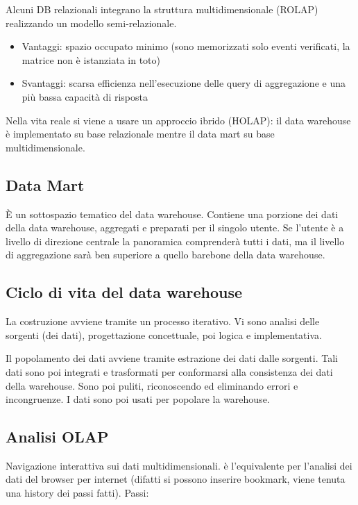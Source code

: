 Alcuni DB relazionali integrano la struttura multidimensionale (ROLAP)
realizzando un modello semi-relazionale.

\begin{itemize}

\item
  Vantaggi: spazio occupato minimo (sono memorizzati solo eventi
  verificati, la matrice non \`e istanziata in toto)
\item
  Svantaggi: scarsa efficienza nell'esecuzione delle query di
  aggregazione e una pi\`u bassa capacit\`a di risposta
\end{itemize}

Nella vita reale si viene a usare un approccio ibrido (HOLAP): il data
warehouse \`e implementato su base relazionale mentre il data mart su base
multidimensionale.

\subsection{Data Mart}\label{data-mart}

\`E un sottospazio tematico del data warehouse.
Contiene una porzione dei dati della data warehouse, aggregati e
preparati per il singolo utente. Se l'utente \`e a livello di direzione
centrale la panoramica comprender\`a tutti i dati, ma il livello di
aggregazione sar\`a ben superiore a quello barebone della data warehouse.

\subsection{Ciclo di vita del data
warehouse}\label{ciclo-di-vita-del-data-warehouse}

La costruzione avviene tramite un processo iterativo. Vi sono analisi
delle sorgenti (dei dati), progettazione concettuale, poi logica e
implementativa.

Il popolamento dei dati avviene tramite estrazione dei dati dalle
sorgenti. Tali dati sono poi integrati e trasformati per conformarsi
alla consistenza dei dati della warehouse. Sono poi puliti, riconoscendo
ed eliminando errori e incongruenze. I dati sono poi usati per popolare
la warehouse.

\subsection{Analisi OLAP}\label{analisi-olap}

Navigazione interattiva sui dati multidimensionali. \`e l'equivalente per
l'analisi dei dati del browser per internet (difatti si possono inserire
bookmark, viene tenuta una history dei passi fatti). Passi:

